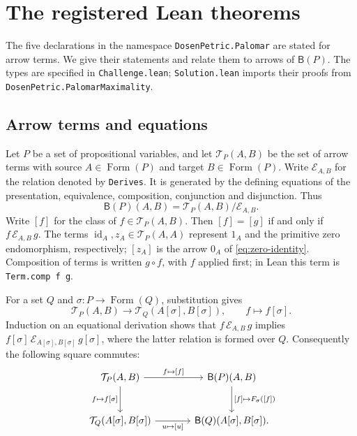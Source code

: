 \documentclass[11pt]{article}
\newcommand{\B}{\mathsf B}
\newcommand{\FormulaSet}{\operatorname{Form}}
\begin{document}
\section{The registered Lean theorems}\label{app:lean-statements}

The five declarations in the namespace \texttt{DosenPetric.Palomar}
are stated for arrow terms. We give their statements and relate them
to arrows of $\B(P)$. The types are specified in \texttt{Challenge.lean};
\texttt{Solution.lean} imports their proofs from
\texttt{DosenPetric.PalomarMaximality}.

\subsection{Arrow terms and equations}

Let $P$ be a set of propositional variables, and let
$\mathcal T_P(A,B)$ be the set of arrow terms with source
$A\in\FormulaSet(P)$ and target $B\in\FormulaSet(P)$.
Write $\mathcal E_{A,B}$ for the relation denoted by
\texttt{Derives}. It is generated by the defining equations of
the presentation, equivalence, composition, conjunction and
disjunction. Thus
\[
 \B(P)(A,B)=\mathcal T_P(A,B)/\mathcal E_{A,B}.
\]
Write $[f]$ for the class of $f\in\mathcal T_P(A,B)$.
Then $[f]=[g]$ if and only if $f\,\mathcal E_{A,B}\,g$.
The terms $\operatorname{id}_A,z_A\in\mathcal T_P(A,A)$ represent
$1_A$ and the primitive zero endomorphism, respectively; $[z_A]$ is
the arrow $0_A$ of
\eqref{eq:zero-identity}. Composition of terms is written $g\circ f$,
with $f$ applied first; in Lean this term is \texttt{Term.comp f g}.

For a set $Q$ and $\sigma:P\to\FormulaSet(Q)$, substitution gives
\[
 \mathcal T_P(A,B)\longrightarrow
 \mathcal T_Q(A[\sigma],B[\sigma]),\qquad f\longmapsto f[\sigma].
\]
Induction on an equational derivation shows that
$f\,\mathcal E_{A,B}\,g$ implies
$f[\sigma]\,\mathcal E_{A[\sigma],B[\sigma]}\,g[\sigma]$,
where the latter relation is formed over $Q$.
Consequently the following square commutes:
\[
\begin{tikzcd}[column sep=large,row sep=large]
 \mathcal T_P(A,B)\arrow[r,"{f\mapsto[f]}"]
   \arrow[d,"{f\mapsto f[\sigma]}"']
   &\B(P)(A,B)\arrow[d,"{[f]\mapsto F_\sigma([f])}"]\\
 \mathcal T_Q(A[\sigma],B[\sigma])
   \arrow[r,"{u\mapsto[u]}"']
   &\B(Q)(A[\sigma],B[\sigma]).
\end{tikzcd}
\]
\end{document}
